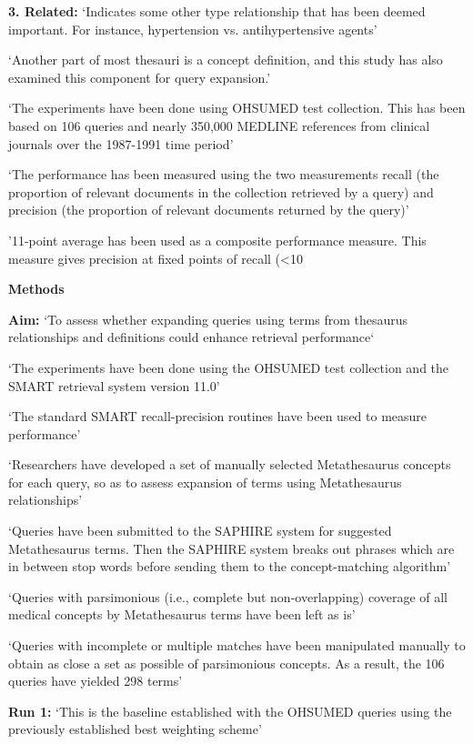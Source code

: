 \documentclass[]{article}
\begin{document}
{{{\textbf{3.	Related:} ‘Indicates some other type relationship that has been deemed important. For instance, hypertension vs. antihypertensive agents’


‘Another part of most thesauri is a concept definition, and this study has also examined this component for query expansion.’

‘The experiments have been done using OHSUMED test collection. This has been based on 106 queries and nearly 350,000 MEDLINE references from clinical journals over the 1987-1991 time period’

‘The performance has been measured using the two measurements recall (the proportion of relevant documents in the collection retrieved by a query) and precision (the proportion of relevant documents returned by the query)’

'11-point average has been used as a composite performance measure. This measure gives precision at fixed points of recall (<10%

\textbf{Methods}

\textbf{Aim:} ‘To assess whether expanding queries using terms from thesaurus relationships and definitions could enhance retrieval performance‘ 

‘The experiments have been done using the OHSUMED test collection and the SMART retrieval system version 11.0’

‘The standard SMART recall-precision routines have been used to measure performance’

‘Researchers have developed a set of manually selected Metathesaurus concepts for each query, so as to assess expansion of terms using Metathesaurus relationships’

‘Queries have been submitted to the SAPHIRE system for suggested Metathesaurus terms. Then the SAPHIRE system breaks out phrases which are in between stop words before sending them to the concept-matching algorithm’

‘Queries with parsimonious (i.e., complete but non-overlapping) coverage of all medical concepts by Metathesaurus terms have been left as is’

‘Queries with incomplete or multiple matches have been manipulated manually to obtain as close a set as possible of parsimonious concepts. As a result, the 106 queries have yielded 298 terms’

\textbf{Run 1:} ‘This is the baseline established with the OHSUMED queries using the previously established best weighting scheme’ 

}}}
\end{document}
